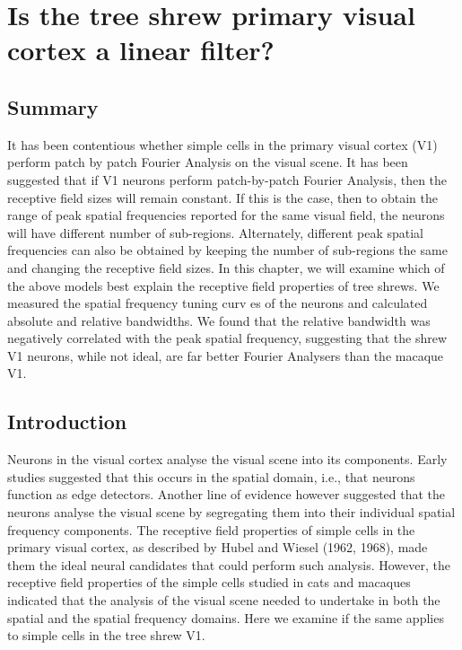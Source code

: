 \chapter[Is V1 a linear filter?]{Is the tree shrew primary visual cortex a linear filter?}

	\section{Summary}
	It has been contentious whether simple cells in the primary visual cortex (V1) perform patch by patch Fourier Analysis on the visual scene. It has been suggested that if V1 neurons perform patch-by-patch Fourier Analysis, then the receptive field sizes will remain constant. If this is the case, then to obtain the range of peak spatial frequencies reported for the same visual field, the neurons will have different number of sub-regions. Alternately, different peak spatial frequencies can also be obtained by keeping the number of sub-regions the same and changing the receptive field sizes. In this chapter, we will examine which of the above models best explain the receptive field properties of tree shrews. We measured the spatial frequency tuning curv es of the neurons and calculated absolute and relative bandwidths. We found that the relative bandwidth was negatively correlated with the peak spatial frequency, suggesting that the shrew V1 neurons, while not ideal, are far better Fourier Analysers than the macaque V1.

	\section{Introduction}
	
	Neurons in the visual cortex analyse the visual scene into its components. Early studies suggested that this occurs in the spatial domain, i.e., that neurons function as edge detectors. Another line of evidence however suggested that the neurons analyse the visual scene by segregating them into their individual spatial frequency components. The receptive field properties of simple cells in the primary visual cortex, as described by Hubel and Wiesel (1962, 1968), made them the ideal neural candidates that could perform such analysis. However, the receptive field properties of the simple cells studied in cats and macaques indicated that the analysis of the visual scene needed to undertake in both the spatial and the spatial frequency domains. Here we examine if the same applies to simple cells in the tree shrew V1.
	
